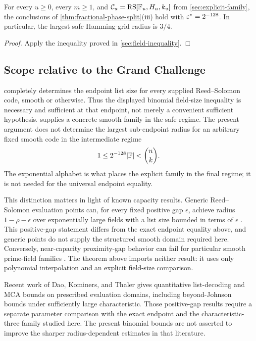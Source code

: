 \begin{corollary}
\label{cor:explicit-family-list}
For every \(u\ge0\), every \(m\ge1\), and
\(\mathcal C_u=\operatorname{RS}[\mathbb{F}_u,H_u,k_u]\) from
\cref{sec:explicit-family}, the conclusions of
\cref{thm:fractional-phase-split}\textup{(iii)} hold with
\(\varepsilon^\ast=2^{-128}\).  In
particular, the largest safe Hamming-grid radius is \(3/4\).
\end{corollary}

\begin{proof}
Apply the inequality proved in \cref{sec:field-inequality}.
\end{proof}

\subsection{Scope relative to the Grand Challenge}

 completely determines the endpoint list size
for every supplied Reed--Solomon code, smooth or otherwise.  Thus the displayed
binomial field-size inequality is necessary and sufficient at that endpoint,
not merely a convenient sufficient hypothesis.
 supplies a concrete smooth family in the safe
regime.  The present argument does not determine the largest sub-endpoint
radius for an arbitrary fixed smooth code in the intermediate regime
\[
  1\le2^{-128}|\mathbb{F}|<\binom nk.
\]
The exponential alphabet is what places the explicit family in the final
regime; it is not needed for the universal endpoint equality.

This distinction matters in light of known capacity results.  Generic
Reed--Solomon evaluation points can, for every fixed positive gap
\(\epsilon\), achieve radius \(1-\rho-\epsilon\) over exponentially large
fields with a list size bounded in terms of \(\epsilon\)
\cite{brakensiekGopiMakam2024}. This positive-gap statement differs from the
exact endpoint equality above, and generic points do not supply the
structured smooth domain required here. Conversely, near-capacity proximity-gap
behavior can fail for particular smooth prime-field families
\cite{kambire2026}.  The theorem above imports neither result: it uses only
polynomial interpolation and an explicit field-size comparison.

Recent work of Dao, Kominers, and Thaler \cite{daoKominersThaler2026}
gives quantitative list-decoding and MCA bounds on prescribed evaluation
domains, including beyond-Johnson bounds under sufficiently large
characteristic. Those positive-gap results require a separate parameter
comparison with the exact endpoint and the characteristic-three family
studied here. The present binomial bounds are not asserted to improve the
sharper radius-dependent estimates in that literature.
